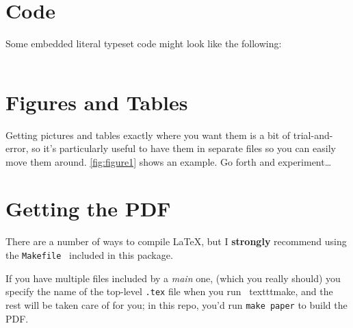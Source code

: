 \documentclass[letterpaper,twocolumn,10pt,final]{article}
\begin{document}
\section{\label{sec:code}Code}
Some embedded literal typeset code might look like the following:
\\ %
\texttt{
    \small
}


\section{\label{sec:ft}Figures and Tables}
Getting pictures and tables exactly where you want them is a bit of trial-and-
error, so it's particularly useful to have them in separate files so you can
easily move them around. \autoref{fig:figure1} shows an example. Go forth and
experiment\ldots





\section{\label{sec:tex}Getting the PDF}
There are a number of ways to compile LaTeX, but I \textbf{strongly} recommend
using the \texttt{Makefile}~\cite{latex-makefile} included in this package.

If you have multiple files included by a \textit{main} one, (which you really
should) you specify the name of the top-level \texttt{.tex} file when you run \
texttt{make}, and the rest will be taken care of for you; \eg in this repo,
you'd run \texttt{make paper} to build the PDF.

{\footnotesize
    
    
}

\theendnotes
\end{document}
